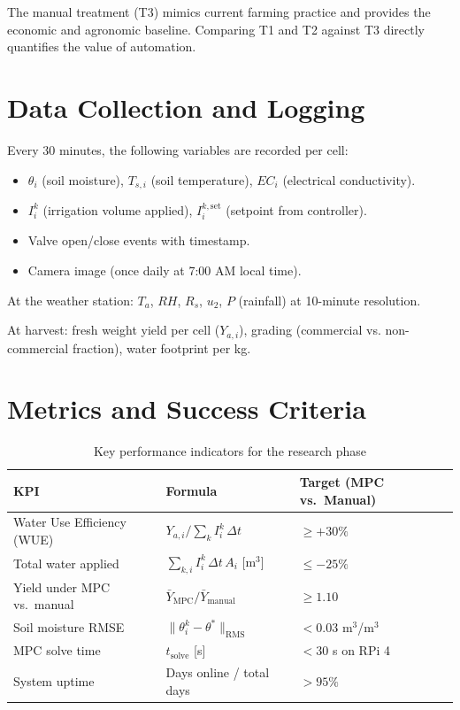 \documentclass[12pt, a4paper]{report}
\begin{document}
The manual treatment (T3) mimics current farming practice and provides the economic and agronomic baseline. Comparing T1 and T2 against T3 directly quantifies the value of automation.

\section{Data Collection and Logging}

Every 30 minutes, the following variables are recorded per cell:
\begin{itemize}[leftmargin=2em]
  \item $\theta_i$ (soil moisture), $T_{s,i}$ (soil temperature), $EC_i$ (electrical conductivity).
  \item $I_i^k$ (irrigation volume applied), $I_i^{k,\text{set}}$ (setpoint from controller).
  \item Valve open/close events with timestamp.
  \item Camera image (once daily at 7:00 AM local time).
\end{itemize}

At the weather station: $T_a$, $RH$, $R_s$, $u_2$, $P$ (rainfall) at 10-minute resolution.

At harvest: fresh weight yield per cell ($Y_{a,i}$), grading (commercial vs. non-commercial fraction), water footprint per kg.

\section{Metrics and Success Criteria}

\begin{table}[H]
\centering
\caption{Key performance indicators for the research phase}
\label{tab:kpi}
\renewcommand{\arraystretch}{1.3}
\begin{tabular}{lll}
\toprule
\textbf{KPI} & \textbf{Formula} & \textbf{Target (MPC vs.\ Manual)}\\
\midrule
Water Use Efficiency (WUE) & $Y_{a,i}/\sum_k I_i^k\,\Delta t$ & $\geq +30\%$ \\
Total water applied        & $\sum_{k,i} I_i^k\,\Delta t\,A_i$ [m$^3$] & $\leq -25\%$ \\
Yield under MPC vs.\ manual & $\bar{Y}_{\text{MPC}}/\bar{Y}_{\text{manual}}$ & $\geq 1.10$ \\
Soil moisture RMSE         & $\|\theta_i^k - \theta^*\|_{\text{RMS}}$ & $< 0.03$ m$^3$/m$^3$ \\
MPC solve time             & $t_{\text{solve}}$ [s] & $< 30$ s on RPi 4 \\
System uptime              & Days online / total days & $> 95\%$ \\
\bottomrule
\end{tabular}
\end{table}
\end{document}
